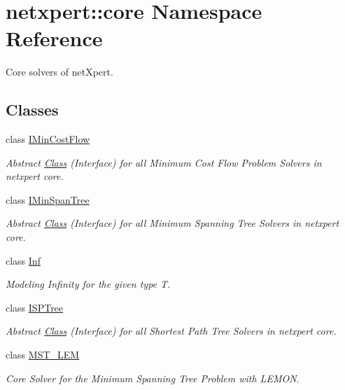 \hypertarget{namespacenetxpert_1_1core}{}\section{netxpert\+:\+:core Namespace Reference}
\label{namespacenetxpert_1_1core}


Core solvers of net\+Xpert.  


\subsection*{Classes}
\begin{DoxyCompactItemize}
\item 
class \hyperlink{classnetxpert_1_1core_1_1IMinCostFlow}{I\+Min\+Cost\+Flow}
\begin{DoxyCompactList}\small\item\em Abstract \hyperlink{classClass}{Class} (Interface) for all Minimum Cost Flow Problem Solvers in netxpert core. \end{DoxyCompactList}\item 
class \hyperlink{classnetxpert_1_1core_1_1IMinSpanTree}{I\+Min\+Span\+Tree}
\begin{DoxyCompactList}\small\item\em Abstract \hyperlink{classClass}{Class} (Interface) for all Minimum Spanning Tree Solvers in netxpert core. \end{DoxyCompactList}\item 
class \hyperlink{classnetxpert_1_1core_1_1Inf}{Inf}
\begin{DoxyCompactList}\small\item\em Modeling Infinity for the given type T. \end{DoxyCompactList}\item 
class \hyperlink{classnetxpert_1_1core_1_1ISPTree}{I\+S\+P\+Tree}
\begin{DoxyCompactList}\small\item\em Abstract \hyperlink{classClass}{Class} (Interface) for all Shortest Path Tree Solvers in netxpert core. \end{DoxyCompactList}\item 
class \hyperlink{classnetxpert_1_1core_1_1MST__LEM}{M\+S\+T\+\_\+\+L\+EM}
\begin{DoxyCompactList}\small\item\em Core Solver for the Minimum Spanning Tree Problem with L\+E\+M\+ON. \end{DoxyCompactList}\item 

\end{DoxyCompactItemize}
